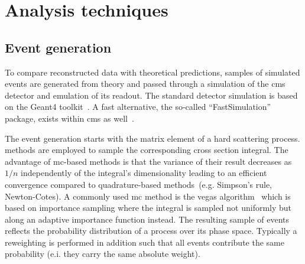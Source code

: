 \chapter{Analysis techniques}


\section{Event generation}

To compare reconstructed data with theoretical predictions, samples of simulated events are generated from theory and passed through a simulation of the \gls{cms} detector and emulation of its readout. The standard detector simulation is based on the Geant4 toolkit~\cite{Agostinelli2003250}. A fast alternative, the so-called ``FastSimulation'' package, exists within \gls{cms} as well~\cite{fsimRahmat}.

The event generation starts with the matrix element of a hard scattering process.  methods are employed to sample the corresponding cross section integral. The advantage of \gls{mc}-based methods is that the variance of their result decreases as $1/n$ independently of the integral's dimensionality leading to an efficient convergence compared to quadrature-based methods~(e.g. Simpson's rule, Newton-Cotes). A commonly used \gls{mc} method is the \gls{vegas} algorithm~\cite{OHL199913} which is based on importance sampling where the integral is sampled not uniformly but along an adaptive importance function instead. The resulting sample of events reflects the probability distribution of a process over its phase space. Typically a reweighting is performed in addition such that all events contribute the same probability (e.i. they carry the same absolute weight). 

